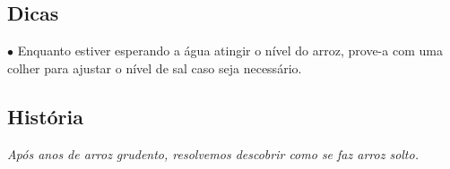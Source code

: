 \begin{aemulticol}[width=0.495\textwidth,height=0.545\textheight]
	\vspace*{-0.15cm}
	\subsection*{\subsectionformat Dicas}
	\vspace*{-0.15cm}
	$\bullet$ Enquanto estiver esperando a água atingir o nível do arroz, prove-a com uma colher para ajustar o nível de sal caso seja necessário.

	\vspace*{-0.15cm}
	\subsection*{\subsectionformat História}
	\vspace*{-0.15cm}
	\textit{Após anos de arroz grudento, resolvemos descobrir como se faz arroz solto.}
\end{aemulticol}
